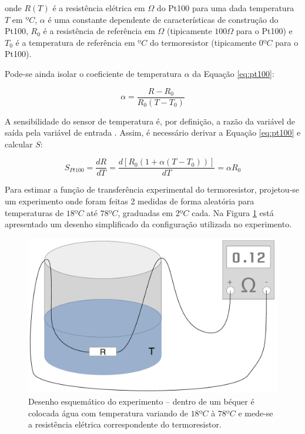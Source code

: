\documentclass[a4paper]{instrumentacao}
\begin{document}
\noindent
onde $R(T)$ é a resistência elétrica em $\Omega$ do Pt100 para uma dada temperatura $T$ em $ºC$, $\alpha$ é uma constante dependente de características de construção do Pt100, $R_0$ é a resistência de referência em $\Omega$ (tipicamente $100 \Omega$ para o Pt100) e $T_0$ é a temperatura de referência em $ºC$ do termoresistor (tipicamente $0ºC$ para o Pt100).

Pode-se ainda isolar o coeficiente de temperatura $\alpha$ da Equação \ref{eq:pt100}:

\begin{equation}
	\alpha=\frac{R-R_0}{R_0(T-T_0)}
	\label{eq:pt100-alpha}
\end{equation}

A sensibilidade do sensor  de temperatura é, por definição, a razão da variável de saída pela variável de entrada \cite{livro-texto}. Assim, é necessário derivar a Equação \ref{eq:pt100} e calcular $S$:

\begin{equation}
	S_{Pt100}=\frac{dR}{dT}=\frac{d[R_0(1+\alpha(T-T_0))]}{dT}=\alpha R_0
	\label{eq:pt100-sensibilidade}
\end{equation}

Para estimar a função de transferência experimental do termoresistor, projetou-se um experimento onde foram feitas 2 medidas de forma aleatória para temperaturas de $18ºC$ até $78ºC$, graduadas em $2ºC$ cada. Na Figura \ref{fig:pt100-esquematico} está apresentado um desenho simplificado da configuração utilizada no experimento.

\begin{figure}[H]
\center
\includegraphics[width=\textwidth]{Bequer.pdf}
\caption{Desenho esquemático do experimento -- dentro de um béquer é colocada água com temperatura variando de $18ºC$ à $78ºC$ e mede-se a resistência elétrica correspondente do termoresistor.}
\label{fig:pt100-esquematico}
\end{figure}
\end{document}
